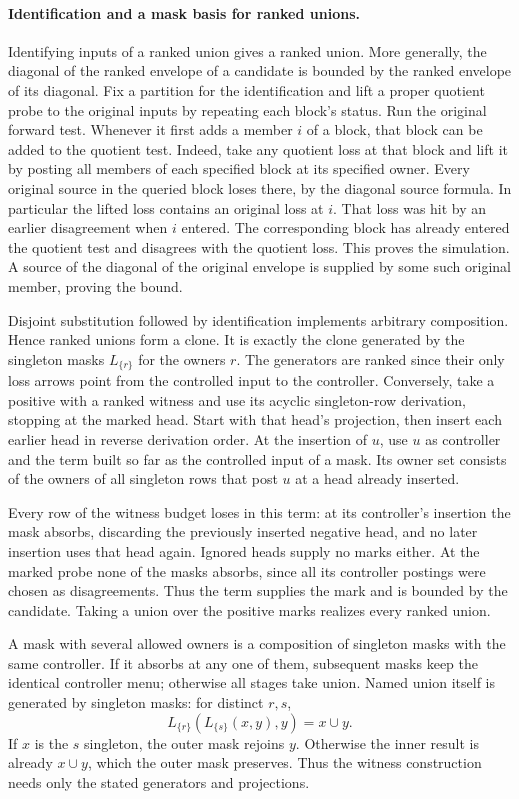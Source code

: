 \paragraph{Identification and a mask basis for ranked unions.}
Identifying inputs of a ranked union gives a ranked union.
More generally, the diagonal of the ranked envelope of a
candidate is bounded by the ranked envelope of its diagonal.
Fix a partition for the identification and lift a proper
quotient probe to the original inputs by repeating each
block's status. Run the original forward test. Whenever
it first adds a member $i$ of a block, that block can be
added to the quotient test. Indeed, take any quotient loss
at that block and lift it by posting all members of each
specified block at its specified owner. Every original
source in the queried block loses there, by the diagonal
source formula. In particular the lifted loss contains
an original loss at $i$. That loss was hit by an earlier
disagreement when $i$ entered. The corresponding block
has already entered the quotient test and disagrees
with the quotient loss. This proves the simulation.
A source of the diagonal of the original envelope is
supplied by some such original member, proving the bound.

Disjoint substitution followed by identification implements
arbitrary composition. Hence ranked unions form a clone.
It is exactly the clone generated by the singleton masks
$L_{\{r\}}$ for the owners $r$.
The generators are ranked since their only loss arrows
point from the controlled input to the controller.
Conversely, take a positive with a ranked witness and use
its acyclic singleton-row derivation, stopping at the
marked head. Start with that head's projection, then insert
each earlier head in reverse derivation order. At the
insertion of $u$, use $u$ as controller and the term built
so far as the controlled input of a mask. Its owner set
consists of the owners of all singleton rows that post
$u$ at a head already inserted.

Every row of the witness budget loses in this term:
at its controller's insertion the mask absorbs, discarding
the previously inserted negative head, and no later
insertion uses that head again. Ignored heads supply no
marks either. At the marked probe none of the masks
absorbs, since all its controller postings were chosen
as disagreements. Thus the term supplies the mark and
is bounded by the candidate. Taking a union over the
positive marks realizes every ranked union.

A mask with several allowed owners is a composition of
singleton masks with the same controller. If it absorbs
at any one of them, subsequent masks keep the identical
controller menu; otherwise all stages take union.
Named union itself is generated by singleton masks:
for distinct $r,s$,
\[
 L_{\{r\}}(L_{\{s\}}(x,y),y)=x\cup y .
\]
If $x$ is the $s$ singleton, the outer mask rejoins $y$.
Otherwise the inner result is already $x\cup y$, which
the outer mask preserves. Thus the witness construction
needs only the stated generators and projections.

